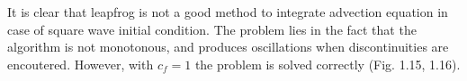 \documentclass[11pt,a4paper]{article}
\begin{document}
\begin{figure}[!h]
\centering
{}
\end{figure}
It is clear that leapfrog is not a good method to integrate advection equation in case of square wave initial condition. The problem lies in the fact that the algorithm is not monotonous, and produces oscillations when discontinuities are encoutered. However, with $c_f=1$ the problem is solved correctly (Fig. 1.15, 1.16).
\end{document}
